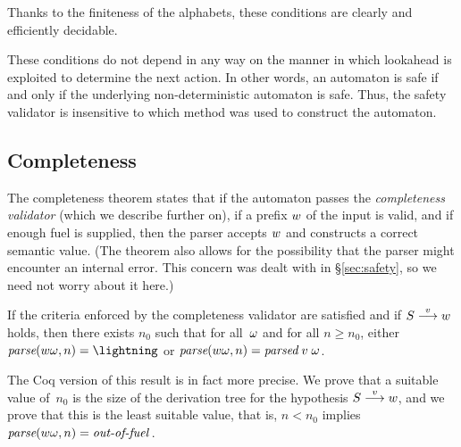 \documentclass{llncs}
\begin{document}
Thanks to the finiteness of the alphabets, these conditions are clearly and
efficiently decidable.

These conditions do not depend in any way on the manner in which lookahead is
exploited to determine the next action. In other words, an \lrone automaton is
safe if and only if the underlying non-deterministic \lrzero automaton is
safe. Thus, the safety validator is insensitive to which method was used to
construct the \lrone automaton.


\subsection{Completeness}
\label{sec:completeness}

The completeness theorem states that if the automaton passes
the \emph{completeness validator} (which we describe further on), if a prefix
$w$ of the input is valid, and if enough fuel is supplied, then the
parser accepts $w$ and constructs a correct semantic value. (The theorem
also allows for the possibility that the parser might encounter an internal
error. This concern was dealt with in \S\ref{sec:safety}, so we need not worry
about it here.)


\begin{theorem}[Completeness]
\label{th:complete}
If the criteria enforced by the completeness validator are satisfied and
if $S\stackrel{v}{\longrightarrow}w$ holds, then
there exists $n_0$ such that
for all~$\omega$ and for all $n\geq n_0$, either
$\parse{\word\stream}{n} = \Err$ or
$\textit{parse}(w\omega, n) = \textit{parsed}\;v\;\omega$.
\end{theorem}

The Coq version of this result is in fact more precise. We prove that a
suitable value of~$n_0$ is the size of the derivation tree for the hypothesis
$S\stackrel{v}{\longrightarrow}w$, and we prove that this is the least suitable value, that
is, $n<n_0$ implies $\textit{parse}(w\omega, n) = \textit{out-of-fuel}\,$.
\end{document}
